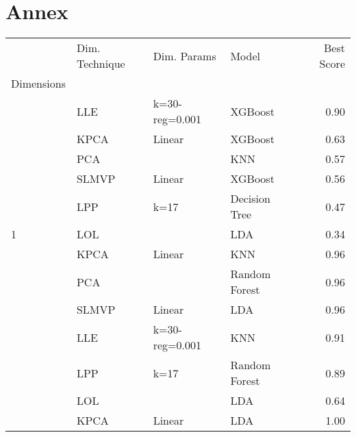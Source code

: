\chapter*{Annex}

\begin{table}
    \begin{tabular}{llllr}
        \toprule
        {}                                      & Dim. Technique & Dim. Params        & Model         & Best Score \\
        Dimensions                              &                &                    &               &            \\
        \midrule
                                                & LLE            & k=30-reg=0.001     & XGBoost       & 0.90       \\
                                                & KPCA           & Linear             & XGBoost       & 0.63       \\
                                                & PCA            &                    & KNN           & 0.57       \\
                                                & SLMVP          & Linear             & XGBoost       & 0.56       \\
                                                & LPP            & k=17               & Decision Tree & 0.47       \\
        \multirow{-6}{*}{1}                     & LOL            &                    & LDA           & 0.34       \\
        \rowcolor{lightgray}                    & KPCA           & Linear             & KNN           & 0.96       \\
        \rowcolor{lightgray}                    & PCA            &                    & Random Forest & 0.96       \\
        \rowcolor{lightgray}                    & SLMVP          & Linear             & LDA           & 0.96       \\
        \rowcolor{lightgray}                    & LLE            & k=30-reg=0.001     & KNN           & 0.91       \\
        \rowcolor{lightgray}                    & LPP            & k=17               & Random Forest & 0.89       \\
        \rowcolor{lightgray}\multirow{-6}{*}{2} & LOL            &                    & LDA           & 0.64       \\
                                                & KPCA           & Linear             & LDA           & 1.00       \\

\end{tabular}
\end{table}
